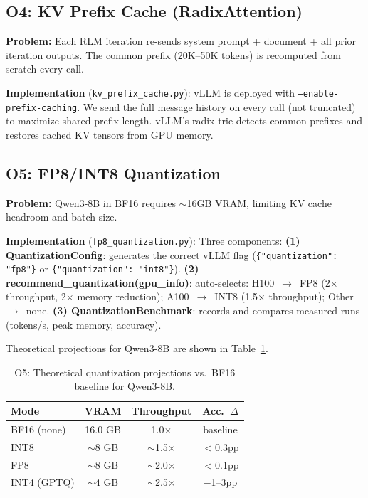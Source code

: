 \documentclass{article}
\begin{document}
\subsection{O4: KV Prefix Cache (RadixAttention)}
\textbf{Problem:} Each RLM iteration re-sends system prompt + document + all prior iteration outputs. The common prefix (20K--50K tokens) is recomputed from scratch every call.

\textbf{Implementation} (\texttt{kv\_prefix\_cache.py}): vLLM is deployed with \texttt{--enable-prefix-caching}. We send the full message history on every call (not truncated) to maximize shared prefix length. vLLM's radix trie detects common prefixes and restores cached KV tensors from GPU memory.

\subsection{O5: FP8/INT8 Quantization}
\textbf{Problem:} Qwen3-8B in BF16 requires $\sim$16GB VRAM, limiting KV cache headroom and batch size.

\textbf{Implementation} (\texttt{fp8\_quantization.py}): Three components:
\textbf{(1) QuantizationConfig}: generates the correct vLLM flag (\texttt{\{"quantization": "fp8"\}} or \texttt{\{"quantization": "int8"\}}).
\textbf{(2) recommend\_quantization(gpu\_info)}: auto-selects: H100~$\to$~FP8 (2$\times$ throughput, 2$\times$ memory reduction); A100~$\to$~INT8 (1.5$\times$ throughput); Other~$\to$~none.
\textbf{(3) QuantizationBenchmark}: records and compares measured runs (tokens/s, peak memory, accuracy).

Theoretical projections for Qwen3-8B are shown in Table~\ref{tab:quant}.

\begin{table}[t]
\caption{O5: Theoretical quantization projections vs.\ BF16 baseline for Qwen3-8B.}
\label{tab:quant}
\vskip 0.1in
\begin{center}
\begin{small}
\begin{sc}
\begin{tabular}{lccc}
\toprule
Mode & VRAM & Throughput & Acc.\ $\Delta$ \\
\midrule
BF16 (none) & 16.0 GB & 1.0$\times$ & baseline \\
INT8        & $\sim$8 GB & $\sim$1.5$\times$ & $<$0.3pp \\
FP8         & $\sim$8 GB & $\sim$2.0$\times$ & $<$0.1pp \\
INT4 (GPTQ) & $\sim$4 GB & $\sim$2.5$\times$ & $-$1--3pp \\
\bottomrule
\end{tabular}
\end{sc}
\end{small}
\end{center}
\vskip -0.1in
\end{table}
\end{document}
